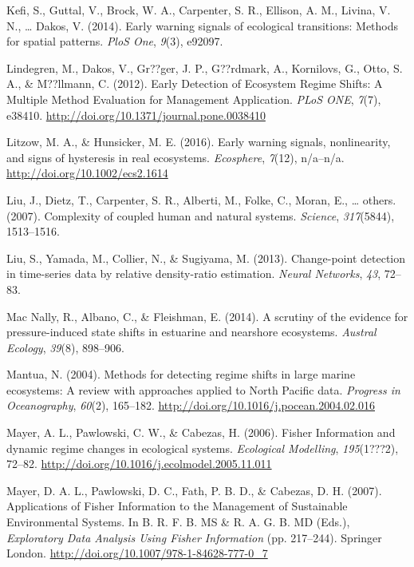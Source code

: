 \documentclass[12pt,twoside,openany]{reedthesis}
\begin{document}
\leavevmode\hypertarget{ref-kefi2014early}{}%
Kefi, S., Guttal, V., Brock, W. A., Carpenter, S. R., Ellison, A. M., Livina, V. N., \ldots{} Dakos, V. (2014). Early warning signals of ecological transitions: Methods for spatial patterns. \emph{PloS One}, \emph{9}(3), e92097.

\leavevmode\hypertarget{ref-lindegren_early_2012}{}%
Lindegren, M., Dakos, V., Gr??ger, J. P., G??rdmark, A., Kornilovs, G., Otto, S. A., \& M??llmann, C. (2012). Early Detection of Ecosystem Regime Shifts: A Multiple Method Evaluation for Management Application. \emph{PLoS ONE}, \emph{7}(7), e38410. \url{http://doi.org/10.1371/journal.pone.0038410}

\leavevmode\hypertarget{ref-litzow_early_2016}{}%
Litzow, M. A., \& Hunsicker, M. E. (2016). Early warning signals, nonlinearity, and signs of hysteresis in real ecosystems. \emph{Ecosphere}, \emph{7}(12), n/a--n/a. \url{http://doi.org/10.1002/ecs2.1614}

\leavevmode\hypertarget{ref-liu_complexity_2007}{}%
Liu, J., Dietz, T., Carpenter, S. R., Alberti, M., Folke, C., Moran, E., \ldots{} others. (2007). Complexity of coupled human and natural systems. \emph{Science}, \emph{317}(5844), 1513--1516.

\leavevmode\hypertarget{ref-liu2013change}{}%
Liu, S., Yamada, M., Collier, N., \& Sugiyama, M. (2013). Change-point detection in time-series data by relative density-ratio estimation. \emph{Neural Networks}, \emph{43}, 72--83.

\leavevmode\hypertarget{ref-mac2014scrutiny}{}%
Mac Nally, R., Albano, C., \& Fleishman, E. (2014). A scrutiny of the evidence for pressure-induced state shifts in estuarine and nearshore ecosystems. \emph{Austral Ecology}, \emph{39}(8), 898--906.

\leavevmode\hypertarget{ref-mantua_methods_2004}{}%
Mantua, N. (2004). Methods for detecting regime shifts in large marine ecosystems: A review with approaches applied to North Pacific data. \emph{Progress in Oceanography}, \emph{60}(2), 165--182. \url{http://doi.org/10.1016/j.pocean.2004.02.016}

\leavevmode\hypertarget{ref-mayer_fisher_2006}{}%
Mayer, A. L., Pawlowski, C. W., \& Cabezas, H. (2006). Fisher Information and dynamic regime changes in ecological systems. \emph{Ecological Modelling}, \emph{195}(1???2), 72--82. \url{http://doi.org/10.1016/j.ecolmodel.2005.11.011}

\leavevmode\hypertarget{ref-mayer_applications_2007}{}%
Mayer, D. A. L., Pawlowski, D. C., Fath, P. B. D., \& Cabezas, D. H. (2007). Applications of Fisher Information to the Management of Sustainable Environmental Systems. In B. R. F. B. MS \& R. A. G. B. MD (Eds.), \emph{Exploratory Data Analysis Using Fisher Information} (pp. 217--244). Springer London. \url{http://doi.org/10.1007/978-1-84628-777-0_7}
\end{document}
